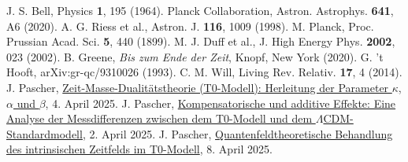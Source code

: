 \documentclass[12pt,a4paper]{article}
\begin{document}
\begin{thebibliography}{99}
		 J. S. Bell, Physics \textbf{1}, 195 (1964).
		 Planck Collaboration, Astron. Astrophys. \textbf{641}, A6 (2020).
		 A. G. Riess et al., Astron. J. \textbf{116}, 1009 (1998).
		 M. Planck, Proc. Prussian Acad. Sci. \textbf{5}, 440 (1899).
		 M. J. Duff et al., J. High Energy Phys. \textbf{2002}, 023 (2002).
		 B. Greene, \textit{Bis zum Ende der Zeit}, Knopf, New York (2020).
		 G. 't Hooft, arXiv:gr-qc/9310026 (1993).
		 C. M. Will, Living Rev. Relativ. \textbf{17}, 4 (2014).
		 J. Pascher, \href{https://github.com/jpascher/T0-Time-Mass-Duality/tree/main/2/pdf/Deutsch/Zeit-Masse-Dualitätstheorie (T0-Modell) Herleitung der Parameter kappa, alpha und beta.pdf}{Zeit-Masse-Dualitätstheorie (T0-Modell): Herleitung der Parameter \(\kappa\), \(\alpha\) und \(\beta\)}, 4. April 2025.
		 J. Pascher, \href{https://github.com/jpascher/T0-Time-Mass-Duality/tree/main/2/pdf/Deutsch/Analyse der Messdifferenzen zwischen dem T0-Modell und dem Standardmodell.pdf}{Kompensatorische und additive Effekte: Eine Analyse der Messdifferenzen zwischen dem T0-Modell und dem \(\Lambda\)CDM-Standardmodell}, 2. April 2025.
		 J. Pascher, \href{https://github.com/jpascher/T0-Time-Mass-Duality/tree/main/2/pdf/Deutsch/Quantenfeldtheoretische Behandlung des intrinsischen Zeitfelds im T0-Modell.pdf}{Quantenfeldtheoretische Behandlung des intrinsischen Zeitfelds im T0-Modell}, 8. April 2025.
	\end{thebibliography}
	
\end{document}
